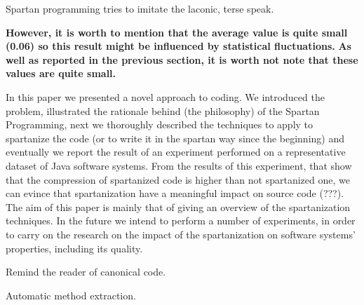 Spartan programming tries to imitate the laconic, terse speak.  

\textbf{However, it is worth to mention that the average value is quite small (0.06) so 
this result might be influenced by statistical fluctuations.}
\textbf{As well as reported in the previous section, it is worth not note that 
these values are quite small.}

In this paper we presented a novel approach to coding. We introduced the
problem, illustrated the rationale behind (the philosophy) of the Spartan
Programming, next we thoroughly described the techniques to apply to spartanize
the code (or to write it in the spartan way since the beginning) and eventually
we report the result of an experiment performed on a representative dataset of
Java software systems.  From the results of this experiment, that show that the
compression of spartanized code is higher than not spartanized one, we can
evince that spartanization have a meaningful impact on source code (???).  The
aim of this paper is mainly that of giving an overview of the spartanization
techniques.  In the future we intend to perform a number of experiments, in
order to carry on the research on the impact of the spartanization on software
systems' properties, including its quality.

Remind the reader of canonical code.

Automatic method extraction.
